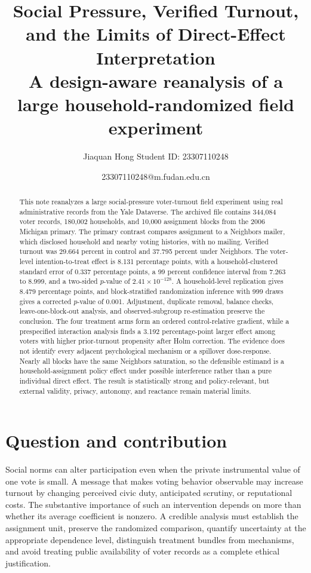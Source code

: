 \documentclass[a4paper,12pt]{article}
\title{Social Pressure, Verified Turnout, and the Limits of Direct-Effect Interpretation\\[4pt]
\large A design-aware reanalysis of a large household-randomized field experiment}
\author{Jiaquan Hong \quad Student ID: 23307110248}
\date{23307110248@m.fudan.edu.cn}
\begin{document}
\maketitle

\renewcommand{\abstractname}{\Large\bfseries Abstract}
\begin{abstract}
\vspace{4pt}
This note reanalyzes a large social-pressure voter-turnout field experiment using real administrative records from the Yale Dataverse. The archived file contains 344,084 voter records, 180,002 households, and 10,000 assignment blocks from the 2006 Michigan primary. The primary contrast compares assignment to a Neighbors mailer, which disclosed household and nearby voting histories, with no mailing. Verified turnout was 29.664 percent in control and 37.795 percent under Neighbors. The voter-level intention-to-treat effect is 8.131 percentage points, with a household-clustered standard error of 0.337 percentage points, a 99 percent confidence interval from 7.263 to 8.999, and a two-sided $p$-value of $2.41\times10^{-128}$. A household-level replication gives 8.479 percentage points, and block-stratified randomization inference with 999 draws gives a corrected $p$-value of 0.001. Adjustment, duplicate removal, balance checks, leave-one-block-out analysis, and observed-subgroup re-estimation preserve the conclusion. The four treatment arms form an ordered control-relative gradient, while a prespecified interaction analysis finds a 3.192 percentage-point larger effect among voters with higher prior-turnout propensity after Holm correction. The evidence does not identify every adjacent psychological mechanism or a spillover dose-response. Nearly all blocks have the same Neighbors saturation, so the defensible estimand is a household-assignment policy effect under possible interference rather than a pure individual direct effect. The result is statistically strong and policy-relevant, but external validity, privacy, autonomy, and reactance remain material limits.
\end{abstract}

\section{Question and contribution}

Social norms can alter participation even when the private instrumental value of one vote is small. A message that makes voting behavior observable may increase turnout by changing perceived civic duty, anticipated scrutiny, or reputational costs. The substantive importance of such an intervention depends on more than whether its average coefficient is nonzero. A credible analysis must establish the assignment unit, preserve the randomized comparison, quantify uncertainty at the appropriate dependence level, distinguish treatment bundles from mechanisms, and avoid treating public availability of voter records as a complete ethical justification.
\end{document}
